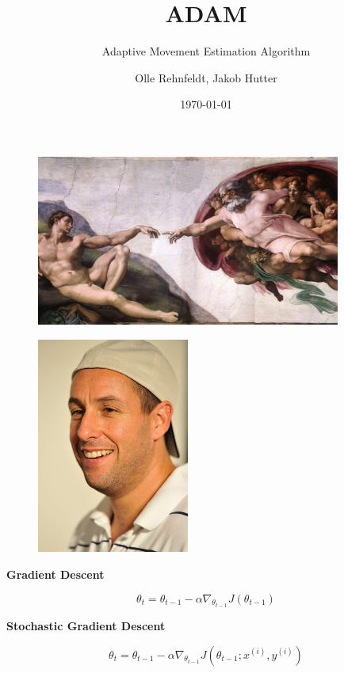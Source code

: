 \documentclass{beamer}
\author{Olle Rehnfeldt, Jakob Hutter}
\title{ADAM}
\subtitle{Adaptive Movement Estimation Algorithm}
\institute{Data Science and Society}
\date{\today}
\newcommand\myheading[1]{%
  \par\bigskip
  {\Large\bfseries#1}\par\smallskip}
\begin{document}
\begin{frame}
    \titlepage
\end{frame}

\begin{frame}
    \begin{figure}[h]
        \includegraphics[width=10cm]{presentation/ADAMS/historical.jpg}
    \end{figure}
\end{frame}

\begin{frame}
    \begin{figure}[h]
        \includegraphics[width=5cm]{presentation/ADAMS/adam_sandler.jpg}
    \end{figure}
\end{frame}


\begin{frame}
    \myheading{Gradient Descent}
    $$\theta_t = \theta_{t-1} - \alpha \nabla_{\theta_{t-1}} J(\theta_{t-1})$$
\end{frame}


\begin{frame}
    \myheading{Stochastic Gradient Descent}
    $$\theta_t = \theta_{t-1} - \alpha \nabla_{\theta_{t-1}} J(\theta_{t-1}; x^{(i)}, y^{(i)})$$
\end{frame}
\end{document}

